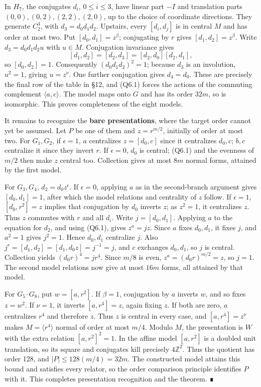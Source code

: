 \documentclass[
  10pt,
  letterpaper,
]{article}
\begin{document}
In \(H_7\), the conjugates \(d_i\), \(0\le i\le3\), have linear part
\(-I\) and translation parts \((0,0),(0,2),(2,2),(2,0)\), up to the
choice of coordinate directions. They generate \(C_2^3\), with
\(d_3=d_0d_1d_2\). Upstairs, every \([d_i,d_j]\) is in central \(M\) and
has order at most two. Put \([d_0,d_1]=z^\beta\); conjugating by \(r\)
gives \([d_1,d_2]=z^\beta\). Write \(d_3=d_0d_1d_2u\) with \(u\in M\).
Conjugation invariance gives \[
 [d_1,d_2]=[d_2,d_3]=[d_2,d_0][d_2,d_1],
\] so \([d_0,d_2]=1\). Consequently \((d_0d_1d_2)^2=1\); because \(d_3\)
is an involution, \(u^2=1\), giving \(u=z^\nu\). One further conjugation
gives \(d_4=d_0\). These are precisely the final row of the table in
§12, and (Q6.1) forces the actions of the commuting complement
\(\langle a,c\rangle\). The model maps onto \(G\) and has its order
\(32m\), so is isomorphic. This proves completeness of the eight models.

It remains to recognize the \textbf{bare presentations}, where the
target order cannot yet be assumed. Let \(P\) be one of them and
\(z=r^{m/2}\), initially of order at most two. For \(G_1,G_2\), if
\(\epsilon=1\), \(a\) centralizes \(z=[d_0,c]\) since it centralizes
\(d_0,c\); \(b,c\) centralize it since they invert \(r\). If
\(\epsilon=0\), \(d_0\) is central; (Q6.1) and the evenness of \(m/2\)
then make \(z\) central too. Collection gives at most \(8m\) normal
forms, attained by the first model.

For \(G_3,G_4\), \(d_2=d_0z^\epsilon\). If \(\epsilon=0\), applying
\(a\) as in the second-branch argument gives \([d_0,d_1]=1\), after
which the model relations and centrality of \(z\) follow. If
\(\epsilon=1\), \([d_0,r^2]=z\) implies that conjugation by \(d_0\)
inverts \(z\); as \(z^2=1\), it centralizes \(z\). Thus \(z\) commutes
with \(r\) and all \(d_i\). Write \(j=[d_0,d_1]\). Applying \(a\) to the
equation for \(d_2\), and using (Q6.1), gives \(z^a=jz\). Since \(a\)
fixes \(d_0,d_1\), it fixes \(j\), and \(a^2=1\) gives \(j^2=1\). Hence
\(d_0,d_1\) centralize \(j\). Also
\(j^r=[d_1,d_2]=[d_1,d_0z]=j^{-1}=j\), and \(c\) exchanges \(d_0,d_1\),
so \(j\) is central. Collection yields \((d_0r)^4=j r^4\). Since \(m/8\)
is even, \(z^a=(d_0r)^{m/2}=z\), so \(j=1\). The second model relations
now give at most \(16m\) forms, all attained by that model.

For \(G_5\)--\(G_8\), put \(w=[a,r^2]\). If \(\beta=1\), conjugation by
\(a\) inverts \(w\), and so fixes \(z=w^2\). If \(\nu=1\), it inverts
\([a,r^4]=z\), again fixing \(z\). If both are zero, \(a\) centralizes
\(r^4\) and therefore \(z\). Thus \(z\) is central in every case, and
\([a,r^4]=z^\nu\) makes \(M=\langle r^4\rangle\) normal of order at most
\(m/4\). Modulo \(M\), the presentation is \(W\) with the extra relation
\([a,r^2]^2=1\). In the affine model \([a,r^2]\) is a doubled unit
translation, so its square and conjugates kill precisely
\(4\mathbb Z^2\). Thus the quotient has order 128, and
\(|P|\le128(m/4)=32m\). The constructed model attains this bound and
satisfies every relator, so the order comparison principle identifies
\(P\) with it. This completes presentation recognition and the theorem.
∎
\end{document}
